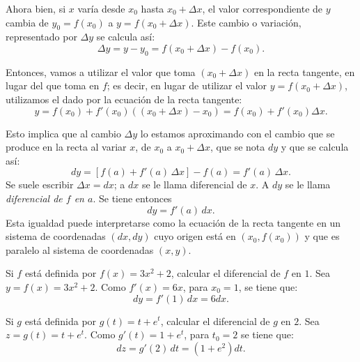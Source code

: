 Ahora bien, si $x$ varía desde $x_{0}$ hasta $x_0 + \Delta x$, el valor correspondiente de $y$
cambia de $y_{0}=f(x_{0})$ a $y = f(x_{0}+\Delta x)$. Este cambio o variación, representado por
$\Delta y$ se calcula así:
\begin{equation*}
	 \Delta y = y - y_{0}=f(x_{0}+\Delta x)-f(x_{0}).
\end{equation*}

Entonces, vamos a utilizar el valor que toma $(x_{0}+\Delta x)$ en la recta tangente, en lugar del
que toma en $f$; es decir, en lugar de utilizar el valor $y = f(x_{0}+\Delta x)$, utilizamos el
dado por la ecuación de la recta tangente:
\begin{equation*}
	 y = f(x_{0}) +f'(x_{0})((x_{0}+\Delta x)-x_{0})= f(x_{0})+f'(x_{0})\Delta x.
\end{equation*}

Esto implica que al cambio $\Delta y$ lo estamos aproximando con el cambio que se produce en la
recta al variar $x$, de $x_{0}$ a $x_{0}+\Delta x$, que se nota $d y$ y que se calcula así:
\begin{equation*}
	d y=[f(a)+f'(a)\, \Delta x]-f(a)=f'(a)\, \Delta x.
\end{equation*}
Se suele escribir $\Delta x = d x$; a $d x$ se le llama diferencial de $x$. A $d y$ se le llama
\emph{diferencial de $f$ en $a$}. Se tiene entonces
\begin{equation*}
	d y=f'(a)\, d x.
\end{equation*}
Esta igualdad puede interpretarse como la ecuación de la recta tangente en un sistema de
coordenadas $(d x, d y)$ cuyo origen está en $(x_{0},f(x_{0}))$ y que es paralelo al sistema de
coordenadas $(x,y)$.

\begin{exemplo}[Solución]{%
Si $f$ está definida por $f(x) = 3x^2 + 2$, calcular el diferencial de $f$ en $1$.
}%
Sea $y = f(x) = 3x^{2} + 2$. Como $f'(x) = 6x$, para $x_{0}=1$, se tiene que:
\begin{equation*}
	dy=f'(1)\,dx=6dx.
\end{equation*}
\end{exemplo}

\begin{exemplo}[Solución]{%
Si $g$ está definida por $g(t) = t + e^t$, calcular el diferencial de $g$ en $2$.
}%
Sea $z=g(t)=t+e^{t}$. Como $g'(t) = 1+e^{t}$, para $t_{0}=2$ se tiene que:
\begin{equation*}
	dz=g'(2)\,dt=(1+e^{2})dt.
\end{equation*}
\end{exemplo}

